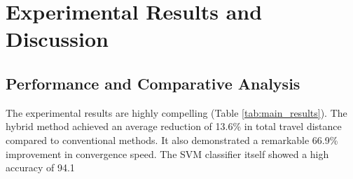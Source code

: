 \documentclass[conference]{IEEEtran} %
\begin{document}
\begin{table}[ht]
\centering
\caption{Parameter Configuration of the Hybrid Framework}
\label{tab:parameters}
\end{table}

\section{Experimental Results and Discussion}

\subsection{Performance and Comparative Analysis}
The experimental results are highly compelling (Table \ref{tab:main_results}). The hybrid method achieved an average reduction of 13.6\% in total travel distance compared to conventional methods. It also demonstrated a remarkable 66.9\% improvement in convergence speed. The SVM classifier itself showed a high accuracy of 94.1%

\begin{table}[H]
\centering
\caption{Aggregated Experimental Results of the Hybrid CP-SVM Framework}
\label{tab:main_results}
\end{table}
\end{document}
